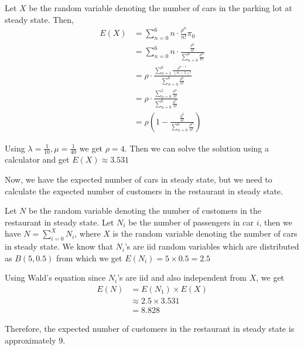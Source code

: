 \documentclass[12pt, oneside]{article}
\begin{document}
\begin{enumerate}
{    Let \(X\) be the random variable denoting the number of cars in the parking lot
    at steady state. Then,
    \begin{align*}
        E(X) &= \sum_{n = 0}^{6} n \cdot \frac{\rho^n}{n!} \pi_0 \\
             &= \sum_{n = 0}^{6} n \cdot \frac{\frac{\rho^n}{n!}}{\sum_{n = 0}^{6} \frac{\rho^n}{n!}} \\
             &= \rho \cdot \frac{\sum_{n=1}^{6} \frac{\rho^{n-1}}{(n-1)!}}{\sum_{n = 0}^{6} \frac{\rho^n}{n!}} \\
             &= \rho \cdot \frac{\sum_{n=0}^{5} \frac{\rho^{n}}{n!}}{\sum_{n = 0}^{6} \frac{\rho^n}{n!}} \\
             &= \rho \left(1 - \frac{\frac{\rho^6}{6!}}
                                    {\sum_{n = 0}^{6} \frac{\rho^n}{n!}}\right)        
    \end{align*}

    Using \(\lambda = \frac{1}{10}, \mu = \frac{1}{40}\) we get \(\rho = 4\). Then we can
    solve the solution using a calculator and get \(E(X) \approx 3.531\)

    Now, we have the expected number of cars in steady state, but we need to calculate the
    expected number of customers in the restaurant in steady state.

    Let \(N\) be the random variable denoting the number of customers in the restaurant in
    steady state. Let \(N_i\) be the number of passengers in car \(i\), then we have 
    \(N = \sum_{i = 0}^{X} N_i\), where \(X\) is the random variable denoting the number of cars
    in steady state. We know that \(N_i\)'s are iid random variables which 
    are distributed as \(B(5, 0.5)\) from which we get \(E(N_i) = 5 \times 0.5 = 2.5\)

    Using Wald's equation since \(N_i\)'s are iid and also independent from \(X\), we get
    \begin{align*}
        E(N) &= E(N_1) \times E(X) \\
             &\approx 2.5 \times 3.531 \\
             &= 8.828
    \end{align*}

    Therefore, the expected number of customers in the restaurant in steady state is
    approximately 9.
}

\end{enumerate}
\end{document}
